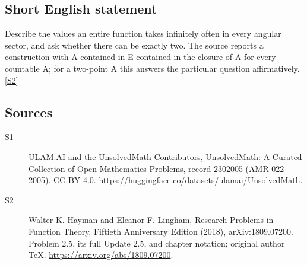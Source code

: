 \documentclass[11pt]{article}
\newcommand{\sref}[2]{\hyperlink{source:#1:#2}{[S#2]}}
\begin{document}
\subsection{Short English statement}
Describe the values an entire function takes infinitely often in every angular sector, and ask whether there can be exactly two. The source reports a construction with A contained in E contained in the closure of A for every countable A; for a two-point A this answers the particular question affirmatively. \sref{2302005}{2}
\subsection{Sources}
\begin{description}
\item[\hypertarget{source:2302005:1}{S1}] ULAM.AI and the UnsolvedMath Contributors, UnsolvedMath: A Curated Collection of Open Mathematics Problems, record 2302005 (AMR-022-2005). CC BY 4.0. \url{https://huggingface.co/datasets/ulamai/UnsolvedMath}.
\item[\hypertarget{source:2302005:2}{S2}] Walter K. Hayman and Eleanor F. Lingham, Research Problems in Function Theory, Fiftieth Anniversary Edition (2018), arXiv:1809.07200. Problem 2.5, its full Update 2.5, and chapter notation; original author TeX. \url{https://arxiv.org/abs/1809.07200}.
\end{description}
\label{end:2302005}
\end{document}
